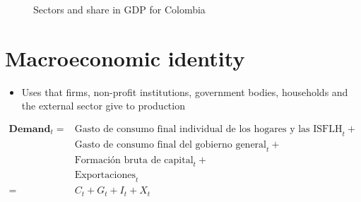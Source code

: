 \documentclass[
  ignorenonframetext,
]{beamer}
\providecommand{\tightlist}{%
  \setlength{\itemsep}{0pt}\setlength{\parskip}{0pt}}\usepackage{longtable,booktabs,array}
\begin{document}
\begin{frame}{}
\label{section-10}
\begin{figure}


\caption{\label{fig-sectors-share-gdp-col-2021}Sectors and share in GDP
for Colombia}

\end{figure}%
\end{frame}

\section{Macroeconomic identity}\label{macroeconomic-identity}

\begin{frame}{}
\label{section-11}
\begin{itemize}
\tightlist
\item
  Uses that firms, non-profit institutions, government bodies,
  households and the external sector give to production
\end{itemize}

\small

\[\begin{split}
  \mathbf{Demand}_t  = & \text{Gasto de consumo final individual de los hogares y las ISFLH}_t + \\
  & \text{Gasto de consumo final del gobierno general}_t + \\
  & \text{Formación bruta de capital}_t + \\
  & \text{Exportaciones}_t \\
  = & C_t + G_t + I_t + X_t
  \end{split}\]
\end{frame}
\end{document}
